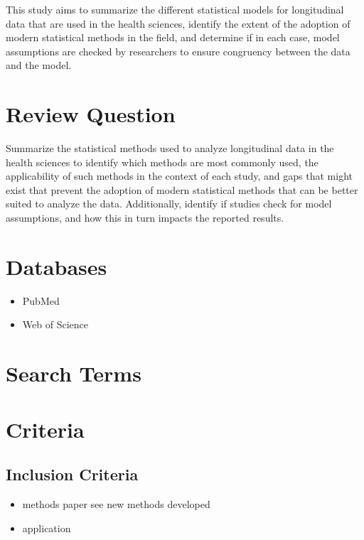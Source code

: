 \documentclass[
]{article}
\providecommand{\tightlist}{%
  \setlength{\itemsep}{0pt}\setlength{\parskip}{0pt}}\usepackage{longtable,booktabs,array}
\begin{document}
This study aims to summarize the different statistical models for
longitudinal data that are used in the health sciences, identify the
extent of the adoption of modern statistical methods in the field, and
determine if in each case, model assumptions are checked by researchers
to ensure congruency between the data and the model.

\hypertarget{review-question}{%
\section{Review Question}\label{review-question}}

Summarize the statistical methods used to analyze longitudinal data in
the health sciences to identify which methods are most commonly used,
the applicability of such methods in the context of each study, and gaps
that might exist that prevent the adoption of modern statistical methods
that can be better suited to analyze the data. Additionally, identify if
studies check for model assumptions, and how this in turn impacts the
reported results.

\hypertarget{databases}{%
\section{Databases}\label{databases}}

\begin{itemize}
\tightlist
\item
  PubMed
\item
  Web of Science
\end{itemize}

\hypertarget{search-terms}{%
\section{Search Terms}\label{search-terms}}

\hypertarget{criteria}{%
\section{Criteria}\label{criteria}}

\hypertarget{inclusion-criteria}{%
\subsection{Inclusion Criteria}\label{inclusion-criteria}}

\begin{itemize}
\item
  methods paper see new methods developed
\item
  application
\end{itemize}
\end{document}
